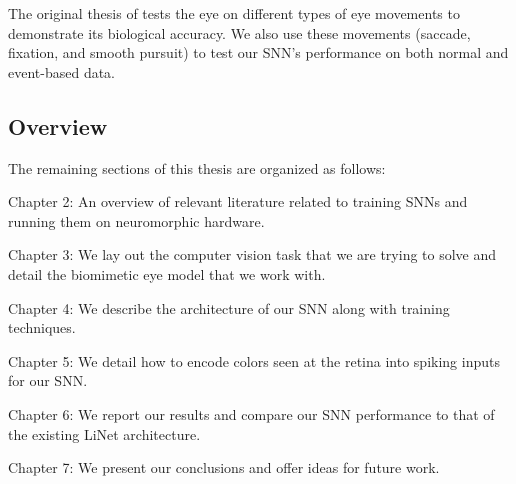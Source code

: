 \documentclass[../taasin.tex]{subfiles}
\begin{document}
The original thesis of \cite{Arjun} tests the eye on different types of eye movements to demonstrate its biological accuracy. We also use these movements (saccade, fixation, and smooth pursuit) to test our SNN's performance on both normal and event-based data.

\subsection{Overview}

The remaining sections of this thesis are organized as follows:

Chapter 2: An overview of relevant literature related to training SNNs and running them on neuromorphic hardware.

Chapter 3: We lay out the computer vision task that we are trying to solve and detail the biomimetic eye model that we work with.

Chapter 4: We describe the architecture of our SNN along with training techniques.

Chapter 5: We detail how to encode colors seen at the retina into spiking inputs for our SNN.

Chapter 6: We report our results and compare our SNN performance to that of the existing LiNet architecture.

Chapter 7: We present our conclusions and offer ideas for future work.
\end{document}
